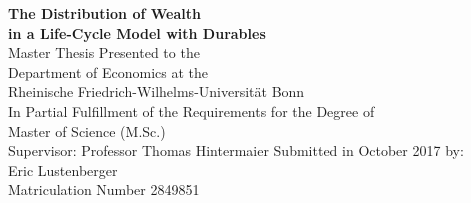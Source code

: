 \documentclass[a4paper,12pt,legno]{article}
\begin{document}



\begin{titlepage}       %

\thispagestyle{empty}   %


\begin{center}
\vspace*{0.5cm}
{\bf  \Large The Distribution of Wealth \\in a Life-Cycle Model with Durables} \\
\vspace*{5cm} 
Master Thesis Presented to the \\ Department of Economics at the\\ Rheinische Friedrich-Wilhelms-Universit\"at Bonn
\\
\vspace*{1.5cm} 
In Partial Fulfillment of the Requirements for the Degree of \\ Master of Science (M.Sc.)\\
\vspace*{8cm} 
Supervisor: Professor Thomas Hintermaier  
\vfill
Submitted in October 2017 by:\\
Eric Lustenberger \\
Matriculation Number 2849851
\end{center}





% 
% 
% 

\end{titlepage}

\newpage                %





 \tableofcontents   %
% 
 \newpage
% 
\listoftables

 \newpage
\end{document}
